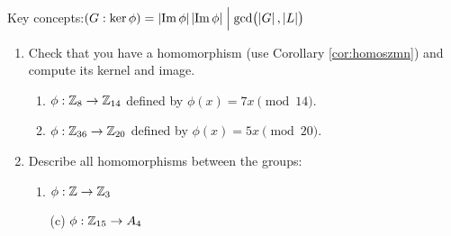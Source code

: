 \begin{exercises}
	Key concepts:\quad \emph{$(G:\ker\phi)=\left| \operatorname{Im}\phi\right|$\quad $\left| \operatorname{Im}\phi\right|\Bigm|\gcd\bigl(\left| G\right|,\left| L\right|\bigr)$}

	
	\begin{enumerate}
	  \item Check that you have a homomorphism (use Corollary \ref{cor:homoszmn}) and compute its kernel and image.
	  \begin{enumerate}
	    \item $\phi:\mathbb{Z}_{8}\to\mathbb{Z}_{14}$ defined by $\phi(x)=7x\pmod{14}$.
	    
	    \item $\phi:\mathbb{Z}_{36}\to\mathbb{Z}_{20}$ defined by $\phi(x)=5x\pmod{20}$.
		\end{enumerate}
	
		
		\item Describe all homomorphisms between the groups:
		\begin{enumerate}
		  \item {}\lstsp $\phi:\mathbb{Z}\to\mathbb{Z}_3$ 
		  \item[(c)] \lstsp $\phi:\mathbb{Z}_{15}\to A_4$
		\end{enumerate}
		
			
% 			
% 		
% 		



\end{enumerate}
\end{exercises}
